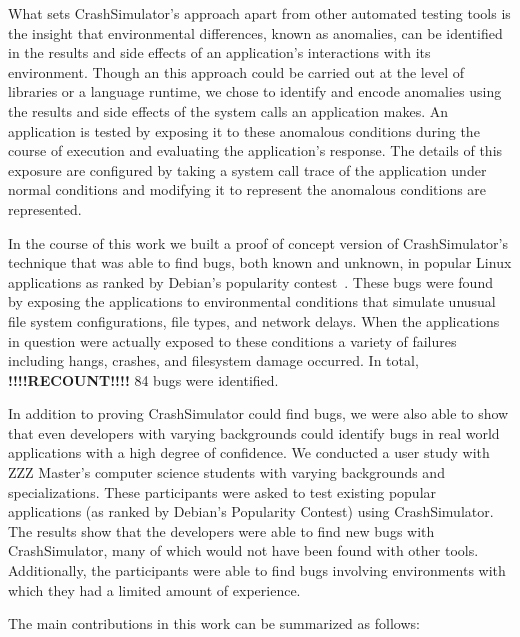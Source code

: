 What sets CrashSimulator's approach apart from other automated testing
tools is the insight that environmental differences, known as anomalies,
can be identified
in the results and side effects of an application's interactions with its
environment.
Though an this approach could be carried out at the level of libraries or a
language runtime, we chose to identify and encode anomalies using the
results and side effects of the system calls an application makes.
An application is tested by exposing it to these anomalous
conditions during the course of execution and evaluating the application's
response.  The details of this exposure are configured by taking a
system call trace of the application under normal conditions and modifying
it to represent the anomalous conditions are represented.

In the course of this work we built a proof of concept version of
CrashSimulator's technique that was able to find bugs, both known and
unknown, in popular Linux applications as ranked by Debian's popularity
contest~\cite{DebPopCon}.  These bugs were found by exposing the
applications to environmental conditions that simulate unusual file system
configurations, file types, and network delays.  When the applications in
question were actually exposed to these conditions a variety of failures
including hangs, crashes, and filesystem damage occurred.  In total,
\textbf{!!!!RECOUNT!!!!} 84
bugs were identified.

In addition to proving CrashSimulator could find bugs, we were also able to
show that even developers with varying backgrounds
could identify bugs in real world applications with a high degree
of confidence.
We conducted a user study with
ZZZ Master's computer
science students with varying backgrounds and specializations.  These
participants were asked to test existing popular applications (as ranked by
Debian's Popularity Contest) using CrashSimulator.
The results show that the developers were able to find new bugs with
CrashSimulator, many of which would not have been found with other
tools.
Additionally, the
participants were able to find bugs
involving environments with which they had a limited amount of experience.

The main contributions in this work can be summarized as follows:

